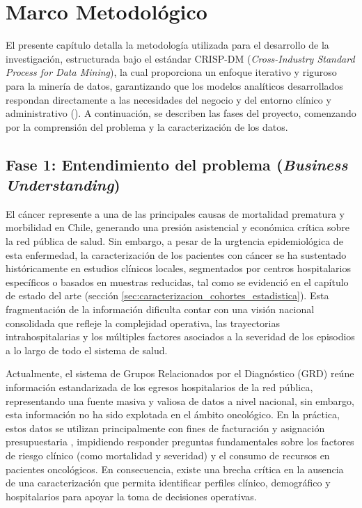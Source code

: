 \chapter{Marco Metodológico}
\label{cap:metodologia}

El presente capítulo detalla la metodología utilizada para el desarrollo de la investigación, estructurada bajo el estándar CRISP-DM (\textit{Cross-Industry Standard Process for Data Mining}), la cual proporciona un enfoque iterativo y riguroso para la minería de datos, garantizando que los modelos analíticos desarrollados respondan directamente a las necesidades del negocio y del entorno clínico y administrativo (\cite{wirth2000crisp}). A continuación, se describen las fases del proyecto, comenzando por la comprensión del problema y la caracterización de los datos.

\section{Fase 1: Entendimiento del problema (\textit{Business Understanding})}
\label{sec:entendimiento_problema}

El cáncer represente a una de las principales causas de mortalidad prematura y morbilidad en Chile, generando una presión asistencial y económica crítica sobre la red pública de salud. Sin embargo, a pesar de la urgtencia epidemiológica de esta enfermedad, la caracterización de los pacientes con cáncer se ha sustentado históricamente en estudios clínicos locales, segmentados por centros hospitalarios específicos o basados en muestras reducidas, tal como se evidenció en el capítulo de estado del arte (sección \ref{sec:caracterizacion_cohortes_estadistica}). Esta fragmentación de la información dificulta contar con una visión nacional consolidada que refleje la complejidad operativa, las trayectorias intrahospitalarias y los múltiples factores asociados a la severidad de los episodios a lo largo de todo el sistema de salud.

Actualmente, el sistema de Grupos Relacionados por el Diagnóstico (GRD) reúne información estandarizada de los egresos hospitalarios de la red pública, representando una fuente masiva y valiosa de datos a nivel nacional, sin embargo, esta información no ha sido explotada en el ámbito oncológico. En la práctica, estos datos se utilizan principalmente con fines de facturación y asignación presupuestaria \cite{fonasa2023_presupuesto, ClapesUC2023}, impidiendo responder preguntas fundamentales sobre los factores de riesgo clínico (como mortalidad y severidad) y el consumo de recursos en pacientes oncológicos. En consecuencia, existe una brecha crítica en la ausencia de una caracterización que permita identificar perfiles clínico, demográfico y hospitalarios para apoyar la toma de decisiones operativas.

